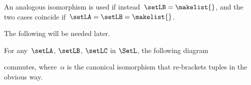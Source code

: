 An analogous isomorphism is used if instead~$\setLB = \makelist{}$, and the two cases coincide if~$\setLA = \setLB = \makelist{}$.

The following will be needed later.

\begin{lemma}\label{lem:coh-isos-compatible}
    For any~$\setLA$, $\setLB$, $\setLC$ in $\SetL$, the following diagram
    \begin{center}
    \end{center}
    commutes, where~$\alpha$ is the canonical isomorphism that re-brackets tuples in the obvious way.
\end{lemma}


